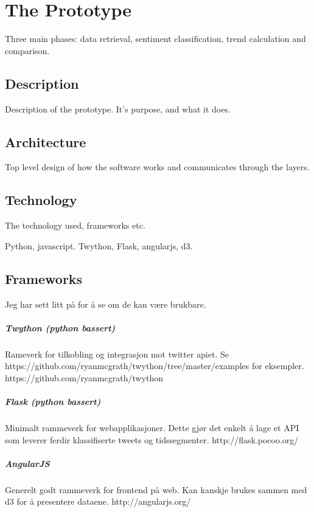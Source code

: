 \chapter{The Prototype}

Three main phases: data retrieval, sentiment classification, trend calculation
and comparison.
\section{Description}
Description of the prototype. It's purpose, and what it does. 

\section{Architecture}
Top level design of how the software works and communicates through the layers.
\section{Technology}
The technology used, frameworks etc.

Python, javascript.
Twython, Flask, angularjs, d3.

\section{Frameworks}
Jeg har sett litt på for å se om de kan være brukbare.

\paragraph{Twython (python bassert)}
Rameverk for tilkobling og integrasjon mot twitter apiet.
Se https://github.com/ryanmcgrath/twython/tree/master/examples for eksempler.
https://github.com/ryanmcgrath/twython

\paragraph{Flask (python bassert)}
Minimalt rammeverk for webapplikasjoner. Dette gjør det enkelt å lage et API som
leverer ferdir klassifiserte tweets og tidssegmenter.
http://flask.pocoo.org/

\paragraph{AngularJS}
Generelt godt rammeverk for frontend på web. Kan kanskje brukes sammen med d3
for å presentere dataene.
http://angularjs.org/

